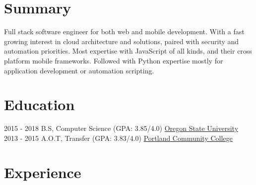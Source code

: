 \documentclass[letterpaper]{twentysecondcv} %
\begin{document}
\makeprofile %


\section{Summary}
    Full stack software engineer for both web and mobile development. With a fast growing interest in cloud architecture and solutions, paired with security and automation priorities. 
    \newline \newline 
    Most expertise with JavaScript of all kinds, and their cross platform mobile frameworks. Followed with Python expertise mostly for application development or automation scripting.
    \newline 

\section{Education}

\begin{twenty} %
	\twentyitem
    	{2015 - 2018 }
        {}
        {  B.S, Computer Science \textnormal{(GPA: 3.85/4.0)}}
        {\href{http://www.oregonstate.edu/}{Oregon State University}}
        {}
        {}
	\twentyitem
    	{2013 - 2015}
		{}
        {  A.O.T, Transfer \textnormal{(GPA: 3.83/4.0)}}
        {\href{https://www.pcc.edu/}{Portland Community College}}
        {}
        {}
\end{twenty}


\section{Experience}
\end{document}
